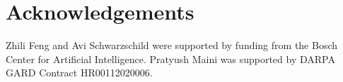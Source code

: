 \section*{Acknowledgements}

Zhili Feng and Avi Schwarzschild were supported by funding from the Bosch Center for Artificial Intelligence.  
Pratyush Maini was supported by DARPA GARD Contract HR00112020006.